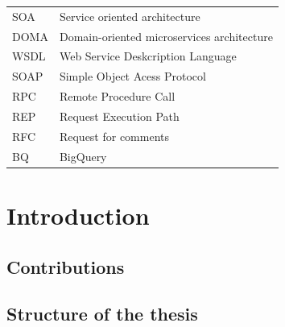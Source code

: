 \documentclass[english, 12pt, a4paper, sci, utf8, a-1b, online]{aaltothesis}
\begin{document}
\begin{tabular}{ll}
SOA          & Service oriented architecture \\
DOMA         & Domain-oriented microservices architecture \\
WSDL         & Web Service Deskcription Language \\
SOAP         & Simple Object Acess Protocol \\
RPC          & Remote Procedure Call \\
REP          & Request Execution Path \\
RFC          & Request for comments \\
BQ           & BigQuery \\

\end{tabular}


\cleardoublepage


\section{Introduction}


\subsection{Contributions}


\subsection{Structure of the thesis}


\thispagestyle{empty}
\end{document}

